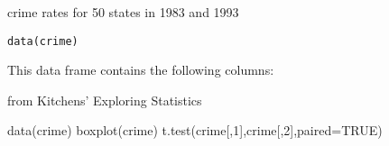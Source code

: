 \begin{Description}\relax
crime rates for 50 states in 1983 and 1993
\end{Description}
\begin{Usage}
\begin{verbatim}data(crime)\end{verbatim}
\end{Usage}
\begin{Format}\relax
This data frame contains the following columns:
\end{Format}
\begin{Source}\relax
from Kitchens' Exploring Statistics
\end{Source}
\begin{Examples}
\begin{ExampleCode}
data(crime)
boxplot(crime)
t.test(crime[,1],crime[,2],paired=TRUE)
\end{ExampleCode}
\end{Examples}

